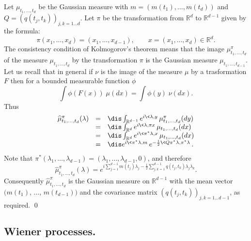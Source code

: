 \documentclass[preprint]{imsart}
\def\R{\mathbb R}
\begin{document}
{
Let $\mu_{t_1,\ldots,t_d}$ be the Gaussian measure with
$m= (m(t_1),\ldots,m(t_d))$ and
$Q=(q(t_j,t_k))_{j,k=1\ldots d}$. Let $\pi$ be the transformation
from $\R^d$ to $\R^{d-1}$ given by the formula:
$$
\pi (x_1,\ldots, x_d)=(x_1,\ldots , x_{d-1}),
\qquad x=(x_1,\ldots, x_d)\in\R^d.
$$
The consistency condition of Kolmogorov's theorem means that
the image $\mu^\pi_{t_1,\ldots,t_d}$ of the measure
$\mu_{t_1,\ldots,t_d}$ by the transformation $\pi$ is the Gaussian
measure $\mu_{t_1,\ldots,t_{d-1}}$. Let us recall that in general
if $\nu$ is the image of the measure $\mu$ by a trasformation $F$
then for a bounded measurable function $\phi$
$$
\int \phi(F(x))\; \mu(dx)=\int \phi(y)\; \nu(dx).
$$
Thus
$$
\begin{array}{lll}
\widehat{\mu}^\pi_{t_1,\ldots,t_d}(\lambda)
&=&\dis
\int_{\R^{d-1}}e^{i\<\lambda,y\>} \mu^\pi_{t_1,\ldots,t_d}(dy)
\\&=&\dis
\int_{\R^{d}}e^{i\<\lambda,\pi x\>} \mu_{t_1,\ldots,t_d}(dx)
\\&=&\dis
\int_{\R^{d}}e^{i\<\pi^*\lambda, x\>} \mu_{t_1,\ldots,t_d}(dx)
\\&=&\dis
e^{i\<\pi^*\lambda,m\>}
e^{-\frac{1}{2}\<Q\pi^*\lambda,\pi^*\lambda\>}.
\end{array}
$$
Note that
$\pi^* (\lambda_1,\ldots, \lambda_{d-1})=
(\lambda_1,\ldots, \lambda_{d-1}, 0)$, and therefore
$$
\widehat{\mu}^\pi_{t_1,\ldots,t_d}(\lambda)=
e^{i\sum_{j=1}^{d-1}m(t_j)\lambda_j
-\frac{1}{2}\sum_{j,k=1}^{d-1}q(t_j,t_k)\lambda_j\lambda_k}.
$$
Consequently
$\widehat{\mu}^\pi_{t_1,\ldots,t_d}$ is the Gaussian measure on
$\R^{d-1}$ with the mean vector
$(m(t_1)$, $\ldots$, $m(t_{d-1}))$  and the covariance matrix
$(q(t_j,t_k))_{j,k=1\ldots d-1}$, as required.
\qed

\subsection{Wiener processes.}

}
\end{document}
